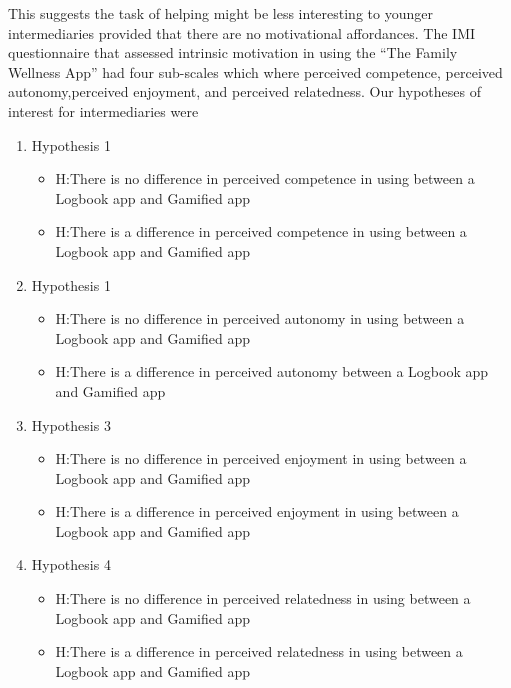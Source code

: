 This suggests the task of helping might be less interesting to younger intermediaries provided that there are no motivational affordances.\newline
The IMI questionnaire that assessed intrinsic motivation in using the ``The Family Wellness App'' had four sub-scales which where perceived competence, perceived autonomy,perceived enjoyment, and perceived relatedness.  
Our hypotheses of interest for intermediaries were
\begin{enumerate}
\item{Hypothesis 1}
\begin{itemize}
\item{H}:There is no difference in perceived competence in using  between a Logbook app and Gamified app
\item{H}:There is a difference in perceived competence in using  between a Logbook app and Gamified app
\end{itemize}
\item{Hypothesis 1}
\begin{itemize}
\item{H}:There is no difference in perceived autonomy in using between a Logbook app and Gamified app
\item{H}:There is a difference in perceived autonomy between a Logbook app and Gamified app
\end{itemize}
\item{Hypothesis 3}
\begin{itemize}
\item{H}:There is no difference in perceived enjoyment in using  between a Logbook app and Gamified app
\item{H}:There is a difference in perceived enjoyment in using between a Logbook app and Gamified app
\end{itemize}
\item{Hypothesis 4}
\begin{itemize}
\item{H}:There is no difference in perceived relatedness in using between a Logbook app and Gamified app
\item{H}:There is a difference in perceived relatedness in using between a Logbook app and Gamified app
\end{itemize}
\end{enumerate}

